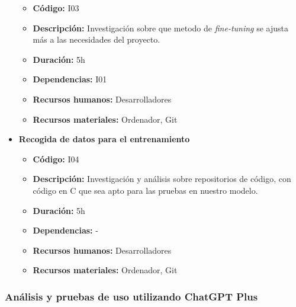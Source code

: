\begin{itemize}
        \begin{itemize}
            \item \textbf{Código:} I03
            \item \textbf{Descripción:} Investigación sobre que metodo de \textit{fine-tuning} se ajusta más a las necesidades del proyecto.
            \item \textbf{Duración:} 5h
            \item \textbf{Dependencias:} I01
            \item \textbf{Recursos humanos:} Desarrolladores
            \item \textbf{Recursos materiales:} Ordenador, Git
        \end{itemize}
    \item \textbf{Recogida de datos para el entrenamiento}
        \begin{itemize}
            \item \textbf{Código:} I04
            \item \textbf{Descripción:} Investigación y análisis sobre repositorios de código, con código en C que sea apto para las pruebas en nuestro modelo. 
            \item \textbf{Duración:} 5h
            \item \textbf{Dependencias:} -
            \item \textbf{Recursos humanos:} Desarrolladores
            \item \textbf{Recursos materiales:} Ordenador, Git
        \end{itemize}
\end{itemize}

\subsubsection{Análisis y pruebas de uso utilizando ChatGPT Plus}
\label{subsubsec:tareas_ichatgpt}


